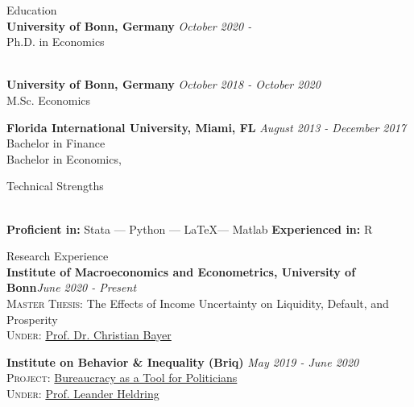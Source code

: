 \documentclass{resume}[10pt] %
\begin{document}

\begin{rSection}{Education}
\\{\bf University of Bonn, Germany} \hfill {\em October 2020 - } 
\\ Ph.D. in Economics\hfill 

\\{\bf University of Bonn, Germany} \hfill {\em October 2018 - October 2020} 
\\ M.Sc. Economics\hfill 

{\bf Florida International University, Miami, FL} \hfill {\em August 2013 - December 2017} 
\\ Bachelor in Finance\hfill 
\\ Bachelor in Economics, 
\end{rSection}
\begin{rSection}{Technical Strengths}

\\ \textbf{Proficient in:} Stata --- Python --- \LaTeX --- Matlab \hspace{2cm} \textbf{Experienced in:} R 
\end{rSection}
\begin{rSection}{Research Experience}
\\{\bf Institute of Macroeconomics and Econometrics, University of Bonn}\hfill {\em June 2020 - Present}\\
\textsc{Master Thesis}: The Effects of Income Uncertainty on Liquidity, Default, and Prosperity \\
\textsc{Under}: \href{https://www.wiwi.uni-bonn.de/bayer/}{Prof. Dr. Christian Bayer}

{\bf Institute on Behavior \& Inequality (Briq)} \hfill {\em May 2019 - June 2020}\\
\textsc{Project}: \href{https://45ec41c8-a-62cb3a1a-s-sites.googlegroups.com/site/leanderheldring/prussia_paper.pdf?attachauth=ANoY7cqs2i79EwmNO-x-kQBopKok-N6wpldq2mVGYViEmRXg932urh3bjZbMDDEr3oQpAI-KOT1MJjrfA23HcfdhsS8U2bS2HIpUMcUWTcK6qwaakrSxvd7Wfb9nwLaQn-RFlYYa6sMj5oO6FopYXrzlU8aUloNr1kGCklYSbivn4AH1kwA1NLjJTSAAdaj0U4uoiH7M8QbpvpoybC4caVWDu8BSYtnS5g\%3D\%3D&attredirects=0}{Bureaucracy as a Tool for Politicians}\\
\textsc{Under}: \href{http://www.leanderheldring.com/}{Prof. Leander Heldring}\\
\end{rSection}
\end{document}
